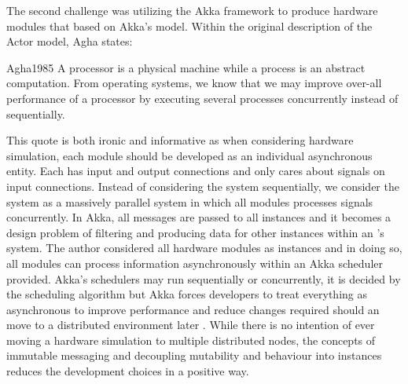 The second challenge was utilizing the Akka framework to produce hardware modules that based on Akka's \akkaActor{} model. Within the original description of the Actor model, Agha states:
\begin{displaycquote}{Agha1985}
    A processor is a physical machine while a process is an abstract computation. From operating systems, we know that we may improve over-all performance of a processor by executing several processes concurrently instead of sequentially.
\end{displaycquote}
This quote is both ironic and informative as when considering hardware simulation, each module should be developed as an individual asynchronous entity. Each has input and output connections and only cares about signals on input connections. Instead of considering the system sequentially, we consider the system as a massively parallel system in which all modules processes signals concurrently. In Akka, all messages are passed to all \akkaActor{} instances and it becomes a design problem of filtering and producing data for other \akkaActor{} instances within an \akkaActor's system. The author considered all hardware modules as \akkaActor{} instances and in doing so, all modules can process information asynchronously within an Akka scheduler provided. Akka's schedulers may run sequentially or concurrently, it is decided by the scheduling algorithm but Akka forces developers to treat everything as asynchronous to improve performance and reduce changes required should an \akkaActor{} move to a distributed environment later \cite{TypesafeAkka2015}. While there is no intention of ever moving a hardware simulation to multiple distributed nodes, the concepts of immutable messaging and decoupling mutability and behaviour into \akkaActor{} instances reduces the development choices in a positive way. 

